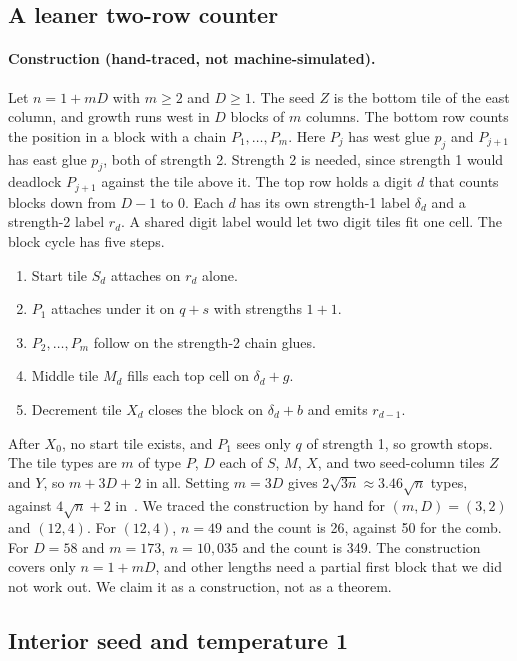 \documentclass[10pt]{hackr26}
\begin{document}
\subsection{A leaner two-row counter}

\paragraph{Construction (hand-traced, not machine-simulated).}
Let $n=1+mD$ with $m\ge2$ and $D\ge1$.
The seed $Z$ is the bottom tile of the east column, and growth runs west in $D$ blocks of $m$ columns.
The bottom row counts the position in a block with a chain $P_1,\dots,P_m$.
Here $P_j$ has west glue $p_j$ and $P_{j+1}$ has east glue $p_j$, both of strength 2.
Strength 2 is needed, since strength 1 would deadlock $P_{j+1}$ against the tile above it.
The top row holds a digit $d$ that counts blocks down from $D-1$ to $0$.
Each $d$ has its own strength-1 label $\delta_d$ and a strength-2 label $r_d$.
A shared digit label would let two digit tiles fit one cell.
The block cycle has five steps.
\begin{enumerate}
  \item Start tile $S_d$ attaches on $r_d$ alone.
  \item $P_1$ attaches under it on $q+s$ with strengths $1+1$.
  \item $P_2,\dots,P_m$ follow on the strength-2 chain glues.
  \item Middle tile $M_d$ fills each top cell on $\delta_d+g$.
  \item Decrement tile $X_d$ closes the block on $\delta_d+b$ and emits $r_{d-1}$.
\end{enumerate}
After $X_0$, no start tile exists, and $P_1$ sees only $q$ of strength 1, so growth stops.
The tile types are $m$ of type $P$, $D$ each of $S$, $M$, $X$, and two seed-column tiles $Z$ and $Y$, so $m+3D+2$ in all.
Setting $m=3D$ gives $2\sqrt{3n}\approx3.46\sqrt n$ types, against $4\sqrt n+2$ in~\cite{ACG05}.
We traced the construction by hand for $(m,D)=(3,2)$ and $(12,4)$.
For $(12,4)$, $n=49$ and the count is 26, against 50 for the comb.
For $D=58$ and $m=173$, $n=10{,}035$ and the count is 349.
The construction covers only $n=1+mD$, and other lengths need a partial first block that we did not work out.
We claim it as a construction, not as a theorem.

\subsection{Interior seed and temperature 1}
\end{document}
